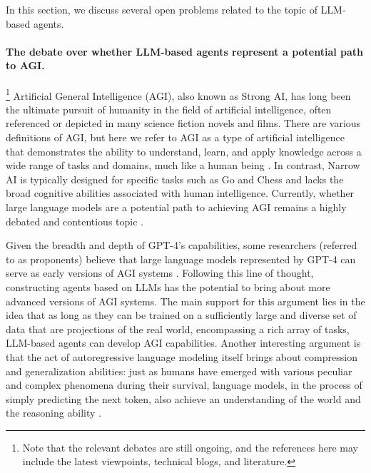 
In this section, we discuss several open problems related to the topic of LLM-based agents.

\paragraph{The debate over whether LLM-based agents represent a potential path to AGI.}\footnote{Note that the relevant debates are still ongoing, and the references here may include the latest viewpoints, technical blogs, and literature.}
Artificial General Intelligence (AGI), also known as Strong AI, has long been the ultimate pursuit of humanity in the field of artificial intelligence, often referenced or depicted in many science fiction novels and films. There are various definitions of AGI, but here we refer to AGI as a type of artificial intelligence that demonstrates the ability to understand, learn, and apply knowledge across a wide range of tasks and domains, much like a human being \cite{DBLP:journals/corr/abs-2303-12712,baum2017survey}. In contrast, Narrow AI is typically designed for specific tasks such as Go and Chess and lacks the broad cognitive abilities associated with human intelligence. Currently, whether large language models are a potential path to achieving AGI remains a highly debated and contentious topic \cite{twitter_1,blog_1,blog_2,blog_3}.

Given the breadth and depth of GPT-4's capabilities, some researchers (referred to as proponents) believe that large language models represented by GPT-4 can serve as early versions of AGI systems \cite{DBLP:journals/corr/abs-2303-12712}. Following this line of thought, constructing agents based on LLMs has the potential to bring about more advanced versions of AGI systems. The main support for this argument lies in the idea that as long as they can be trained on a sufficiently large and diverse set of data that are projections of the real world, encompassing a rich array of tasks, LLM-based agents can develop AGI capabilities. 
Another interesting argument is that the act of autoregressive language modeling itself brings about compression and generalization abilities: just as humans have emerged with various peculiar and complex phenomena during their survival, language models, in the process of simply predicting the next token, also achieve an understanding of the world and the reasoning ability \cite{DBLP:conf/iclr/0002HBVPW23,blog_1,video_1}.


